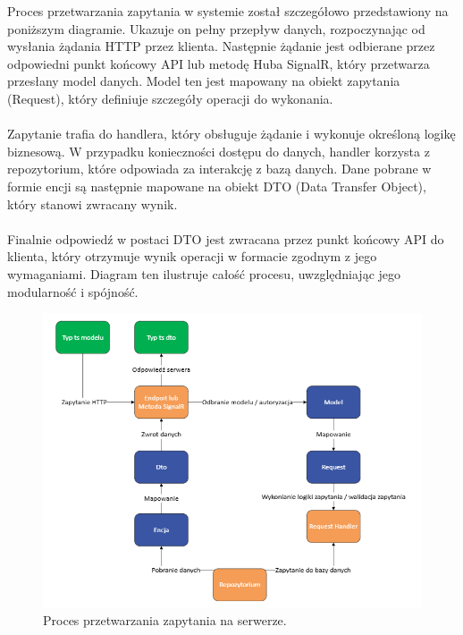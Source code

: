 \documentclass[12pt,a4paper]{article}
\begin{document}
\noindent
Proces przetwarzania zapytania w systemie został szczegółowo przedstawiony na poniższym diagramie. Ukazuje on pełny przepływ danych, rozpoczynając od wysłania żądania HTTP przez klienta. Następnie żądanie jest odbierane przez odpowiedni punkt końcowy API lub metodę Huba SignalR, który przetwarza przesłany model danych. Model ten jest mapowany na obiekt zapytania (Request), który definiuje szczegóły operacji do wykonania.
\\\\
Zapytanie trafia do handlera, który obsługuje żądanie i wykonuje określoną logikę biznesową. W przypadku konieczności dostępu do danych, handler korzysta z repozytorium, które odpowiada za interakcję z bazą danych. Dane pobrane w formie encji są następnie mapowane na obiekt DTO (Data Transfer Object), który stanowi zwracany wynik. 
\\\\
Finalnie odpowiedź w postaci DTO jest zwracana przez punkt końcowy API do klienta, który otrzymuje wynik operacji w formacie zgodnym z jego wymaganiami. Diagram ten ilustruje całość procesu, uwzględniając jego modularność i spójność.

\vspace{1cm}
\begin{figure}[h!]
    \centering
    \includegraphics[width=1\textwidth]{images/diagram_back.png}
    \caption{Proces przetwarzania zapytania na serwerze.}
\end{figure}

\newpage
\end{document}
